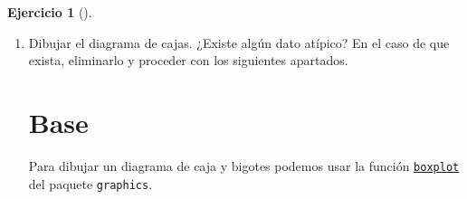 \documentclass[
  spanish,
  a4paper,
]{scrreport}
\newenvironment{Shaded}{\begin{snugshade}}{\end{snugshade}}
\newcommand{\AttributeTok}[1]{\textcolor[rgb]{0.40,0.45,0.13}{#1}}
\newcommand{\DecValTok}[1]{\textcolor[rgb]{0.68,0.00,0.00}{#1}}
\newcommand{\FunctionTok}[1]{\textcolor[rgb]{0.28,0.35,0.67}{#1}}
\newcommand{\NormalTok}[1]{\textcolor[rgb]{0.00,0.23,0.31}{#1}}
\newcommand{\OtherTok}[1]{\textcolor[rgb]{0.00,0.23,0.31}{#1}}
\theoremstyle{definition}
\newtheorem{exercise}{Ejercicio}[chapter]
\theoremstyle{remark}
\begin{document}
\begin{exercise}[]
\begin{enumerate}
\begin{tcolorbox}
  \section{tidyverse}

\begin{Shaded}
\begin{Highlighting}[]
\FunctionTok{library}\NormalTok{(tidyverse)}
\NormalTok{df }\OtherTok{\textless{}{-}} \FunctionTok{tibble}\NormalTok{(}\AttributeTok{urgencias =} \FunctionTok{c}\NormalTok{(}\DecValTok{15}\NormalTok{, }\DecValTok{23}\NormalTok{, }\DecValTok{12}\NormalTok{, }\DecValTok{10}\NormalTok{, }\DecValTok{28}\NormalTok{, }\DecValTok{50}\NormalTok{, }\DecValTok{12}\NormalTok{, }\DecValTok{17}\NormalTok{, }\DecValTok{20}\NormalTok{, }\DecValTok{21}\NormalTok{, }\DecValTok{18}\NormalTok{, }\DecValTok{13}\NormalTok{, }\DecValTok{11}\NormalTok{, }\DecValTok{12}\NormalTok{, }\DecValTok{26}\NormalTok{, }\DecValTok{30}\NormalTok{, }\DecValTok{6}\NormalTok{, }\DecValTok{16}\NormalTok{, }\DecValTok{19}\NormalTok{, }\DecValTok{22}\NormalTok{, }\DecValTok{14}\NormalTok{, }\DecValTok{17}\NormalTok{, }\DecValTok{21}\NormalTok{, }\DecValTok{28}\NormalTok{, }\DecValTok{9}\NormalTok{, }\DecValTok{16}\NormalTok{, }\DecValTok{13}\NormalTok{, }\DecValTok{11}\NormalTok{, }\DecValTok{16}\NormalTok{, }\DecValTok{20}\NormalTok{))}
\end{Highlighting}
\end{Shaded}

  \end{tcolorbox}
\item
  Dibujar el diagrama de cajas. ¿Existe algún dato atípico? En el caso
  de que exista, eliminarlo y proceder con los siguientes apartados.

  \begin{tcolorbox}[enhanced jigsaw, titlerule=0mm, arc=.35mm, rightrule=.15mm, opacitybacktitle=0.6, leftrule=.75mm, colframe=quarto-callout-tip-color-frame, toptitle=1mm, breakable, colbacktitle=quarto-callout-tip-color!10!white, bottomrule=.15mm, colback=white, left=2mm, bottomtitle=1mm, opacityback=0, title=\textcolor{quarto-callout-tip-color}{\faLightbulb}\hspace{0.5em}{Solución}, toprule=.15mm, coltitle=black]

  \section{Base}

  Para dibujar un diagrama de caja y bigotes podemos usar la función
  \href{https://www.rdocumentation.org/packages/graphics/versions/3.6.2/topics/boxplot}{\texttt{boxplot}}
  del paquete \texttt{graphics}.


\end{tcolorbox}
\end{enumerate}
\end{exercise}
\end{document}
